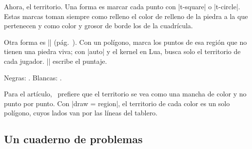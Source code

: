 \begin{goban}
Ahora, el territorio. Una forma es marcar cada punto con |t-square| o |t-circle|. Estas marcas toman siempre como relleno el color de relleno de la piedra a la que pertenecen y como color y grosor de borde los de la cuadrícula.

\begin{codeexample}[width=4.75cm]

	\begin{goban}[label = {at = {above, left}}, resume = final2]
	\end{goban}
\end{codeexample}

Otra forma es |\territory| (pág.~\pageref{subsec:territorio}). Con un polígono, marca los puntos de esa región que no tienen una piedra viva; con |auto| y el kernel en Lua, busca solo el territorio de cada jugador. |\pgfgoscore| escribe el puntaje.

\begin{codeexample}[width=4.75cm]

	\begin{goban}[label = {at = {above, left}}, resume = final2]
	\end{goban}

	Negras: . Blancas: .
\end{codeexample}

Para el artículo, \karu\ prefiere que el territorio se vea como una mancha de color y no punto por punto. Con |draw = region|, el territorio de cada color es un solo polígono, cuyos lados van por las líneas del tablero.

\begin{codeexample}[width=4.75cm]

	\begin{goban}[label = {at = {above, left}}, resume = final2]
	\end{goban}
\end{codeexample}

\subsection{Un cuaderno de problemas}
\label{tut:problemas}


\end{goban}
